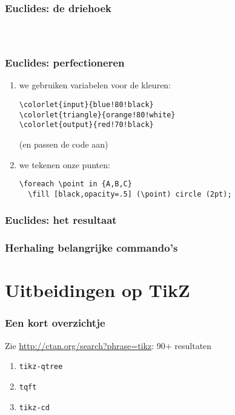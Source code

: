 \documentclass[]{beamer}
\begin{document}
\begin{frame}
  \frametitle{Euclides: de driehoek}

  \begin{columns}
    \begin{column}{.67\textwidth}
      \inputminted[fontsize = \scriptsize]{latex}{tikz/triangle/4a.tikz}
    \end{column}
    \begin{column}{.33\textwidth}
      
    \end{column}
  \end{columns}
\end{frame}

\begin{frame}[fragile]
  \frametitle{Euclides: perfectioneren}

  \begin{enumerate}
    \item we gebruiken variabelen voor de kleuren:
      \begin{verbatim}
\colorlet{input}{blue!80!black}
\colorlet{triangle}{orange!80!white}
\colorlet{output}{red!70!black}
      \end{verbatim}
      (en passen de code aan)
    \item\pause we tekenen onze punten:
      \begin{verbatim}
\foreach \point in {A,B,C}
  \fill [black,opacity=.5] (\point) circle (2pt);
      \end{verbatim}
  \end{enumerate}
\end{frame}

\begin{frame}
  \frametitle{Euclides: het resultaat}

  \centering
  
\end{frame}

\begin{frame}
  \frametitle{Herhaling belangrijke commando's}
\end{frame}

\section{Uitbeidingen op TikZ}

\begin{frame}
  \frametitle{Een kort overzichtje}

  Zie \url{http://ctan.org/search?phrase=tikz}: 90+ resultaten

  \begin{enumerate}
    \item \texttt{tikz-qtree}
    \item \texttt{tqft}
    \item \texttt{tikz-cd}
  \end{enumerate}
\end{frame}
\end{document}
